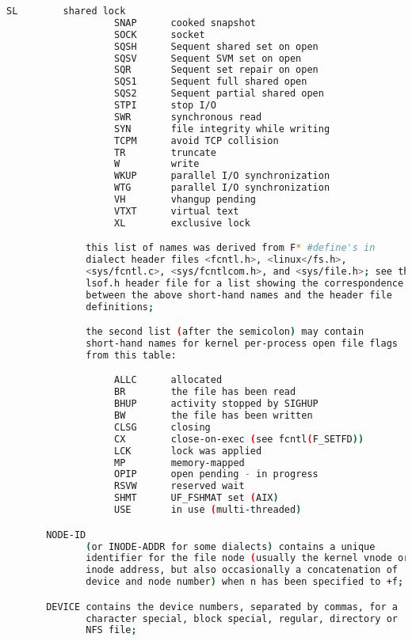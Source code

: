 {{\begin{lstlisting}[language=bash]
                   SL        shared lock
                   SNAP      cooked snapshot
                   SOCK      socket
                   SQSH      Sequent shared set on open
                   SQSV      Sequent SVM set on open
                   SQR       Sequent set repair on open
                   SQS1      Sequent full shared open
                   SQS2      Sequent partial shared open
                   STPI      stop I/O
                   SWR       synchronous read
                   SYN       file integrity while writing
                   TCPM      avoid TCP collision
                   TR        truncate
                   W         write
                   WKUP      parallel I/O synchronization
                   WTG       parallel I/O synchronization
                   VH        vhangup pending
                   VTXT      virtual text
                   XL        exclusive lock

              this list of names was derived from F* #define's in
              dialect header files <fcntl.h>, <linux</fs.h>,
              <sys/fcntl.c>, <sys/fcntlcom.h>, and <sys/file.h>; see the
              lsof.h header file for a list showing the correspondence
              between the above short-hand names and the header file
              definitions;

              the second list (after the semicolon) may contain
              short-hand names for kernel per-process open file flags
              from this table:

                   ALLC      allocated
                   BR        the file has been read
                   BHUP      activity stopped by SIGHUP
                   BW        the file has been written
                   CLSG      closing
                   CX        close-on-exec (see fcntl(F_SETFD))
                   LCK       lock was applied
                   MP        memory-mapped
                   OPIP      open pending - in progress
                   RSVW      reserved wait
                   SHMT      UF_FSHMAT set (AIX)
                   USE       in use (multi-threaded)

       NODE-ID
              (or INODE-ADDR for some dialects) contains a unique
              identifier for the file node (usually the kernel vnode or
              inode address, but also occasionally a concatenation of
              device and node number) when n has been specified to +f;

       DEVICE contains the device numbers, separated by commas, for a
              character special, block special, regular, directory or
              NFS file;


\end{lstlisting}}}
